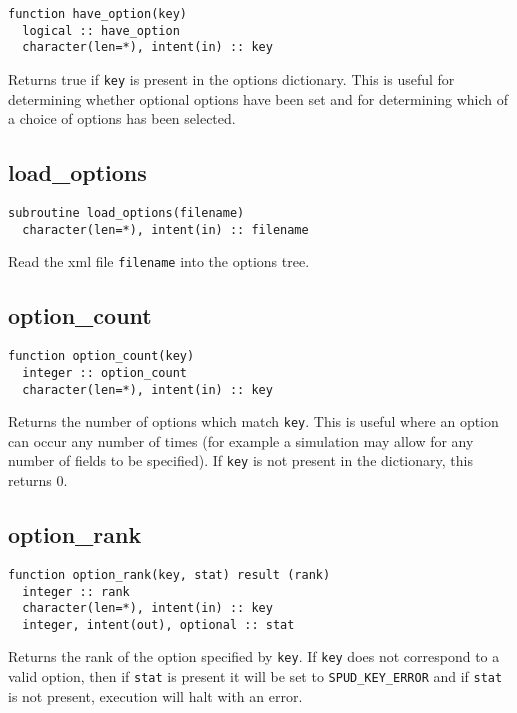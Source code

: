 \documentclass[a4paper, 11pt]{book}
\begin{document}
\begin{lstlisting}
function have_option(key)
  logical :: have_option
  character(len=*), intent(in) :: key
\end{lstlisting}

Returns true if \lstinline+key+ is present in the options
dictionary. This is useful for determining whether optional options have
been set and for determining which of a choice of options has been selected.

\subsection{load\_options}

\begin{lstlisting}
subroutine load_options(filename) 
  character(len=*), intent(in) :: filename
\end{lstlisting}

Read the xml file \lstinline+filename+ into the options tree.

\subsection{option\_count}

\begin{lstlisting}
function option_count(key)
  integer :: option_count
  character(len=*), intent(in) :: key
\end{lstlisting}

Returns the number of options which match \lstinline+key+. This is
useful where an option can occur any number of times (for example a
simulation may allow for any number of fields to be specified). If
\lstinline+key+ is not present in the dictionary, this returns 0.

\subsection{option\_rank}

\begin{lstlisting}
function option_rank(key, stat) result (rank)
  integer :: rank
  character(len=*), intent(in) :: key
  integer, intent(out), optional :: stat
\end{lstlisting}

Returns the rank of the option specified by \lstinline+key+. If
\lstinline+key+ does not correspond to a valid option, then if
\lstinline+stat+ is present it will be set to \lstinline+SPUD_KEY_ERROR+ and
if \lstinline+stat+ is not present, execution will halt with an error.
\end{document}
